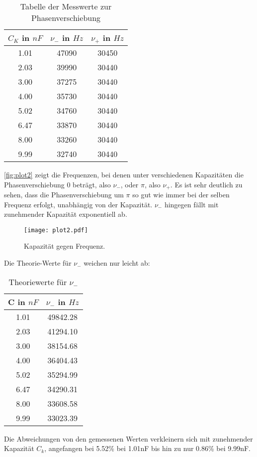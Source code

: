\begin{table}
  \centering
  \caption{Tabelle der Messwerte zur Phasenverschiebung}
  \label{tab:tab2}
  \begin{tabular}{c c c}
    \toprule
    \(C_K\) in $nF$ & \(\nu_-\) in $Hz$ & \(\nu_+\) in $Hz$\\
    \midrule
    1.01 & 47090 & 30450\\
    2.03 & 39990 & 30440\\
    3.00 & 37275 & 30440\\
    4.00 & 35730 & 30440\\
    5.02 & 34760 & 30440\\
    6.47 & 33870 & 30440\\
    8.00 & 33260 & 30440\\
    9.99 & 32740 & 30440\\
    \bottomrule
  \end{tabular}
\end{table}

\autoref{fig:plot2} zeigt die Frequenzen, bei denen unter verschiedenen Kapazitäten die Phasenverschiebung 0 beträgt, also \(\nu_-\), oder \(\pi\), also \(\nu_+\).
Es ist sehr deutlich zu sehen, dass die Phasenverschiebung um \(\pi\) so gut wie immer bei der selben Frequenz erfolgt, unabhängig von der Kapazität.
\(\nu_-\) hingegen fällt mit zunehmender Kapazität exponentiell ab.
\begin{figure}
  \centering
  \texttt{[image: plot2.pdf]}
  \caption{Kapazität gegen Frequenz.}
  \label{fig:plot2}
\end{figure}
\newpage
Die Theorie-Werte für \(\nu_-\) weichen nur leicht ab:
\\
\begin{table}
  \centering
  \caption{Theoriewerte für \(\nu_-\)}
  \label{tab:tab3}
  \begin{tabular}{c c}
    \toprule
    C in \(nF\) & \(\nu_-\) in \(Hz\)\\
    \midrule
    1.01 & 49842.28\\
    2.03 & 41294.10\\
    3.00 & 38154.68\\
    4.00 & 36404.43\\
    5.02 & 35294.99\\
    6.47 & 34290.31\\
    8.00 & 33608.58\\
    9.99 & 33023.39\\
  \end{tabular}
\end{table}
Die Abweichungen von den gemessenen Werten verkleinern sich mit zunehmender Kapazität \(C_k\), angefangen bei 5.52\% bei 1.01nF bis hin zu nur 0.86\% bei 9.99nF.
\newpage
